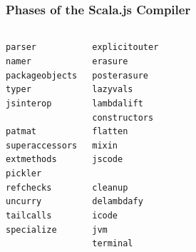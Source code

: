 \documentclass{beamer}
\begin{document}
\begin{frame}
  \frametitle{Phases of the Scala.js Compiler}

  \begin{columns}[t]
    \begin{alltt}
      parser\\
      namer\\
      packageobjects\\
      typer\\
      \alert<2>{jsinterop\\}
      patmat\\
      superaccessors\\
      extmethods\\
      pickler\\
      refchecks\\
      uncurry\\
      tailcalls\\
      specialize\\
    \end{alltt}

    \begin{alltt}
      explicitouter\\
      erasure\\
      posterasure\\
      lazyvals\\
      lambdalift\\
      constructors\\
      flatten\\
      mixin\\
      \alert<2>{jscode\\}
      cleanup\\
      delambdafy\\
      icode\\
      jvm\\
      terminal
    \end{alltt}
  \end{columns}
\end{frame}
\end{document}
